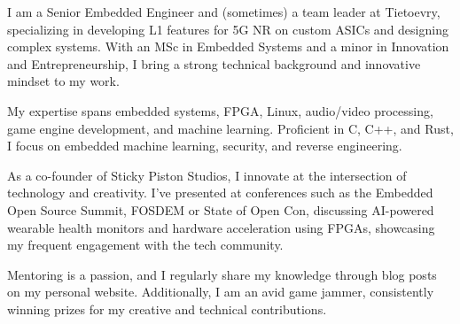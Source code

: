 \documentclass[11pt, a4paper]{awesome-cv}
\begin{document}
\makecvheader

\newline
I am a Senior Embedded Engineer and (sometimes) a team leader at Tietoevry, specializing in developing L1 features for 5G NR on custom ASICs and designing complex systems. With an MSc in Embedded Systems and a minor in Innovation and Entrepreneurship, I bring a strong technical background and innovative mindset to my work.

My expertise spans embedded systems, FPGA, Linux, audio/video processing, game engine development, and machine learning. Proficient in C, C++, and Rust, I focus on embedded machine learning, security, and reverse engineering.

As a co-founder of Sticky Piston Studios, I innovate at the intersection of technology and creativity. I've presented at conferences such as the Embedded Open Source Summit, FOSDEM or State of Open Con, discussing AI-powered wearable health monitors and hardware acceleration using FPGAs, showcasing my frequent engagement with the tech community.

Mentoring is a passion, and I regularly share my knowledge through blog posts on my personal website. Additionally, I am an avid game jammer, consistently winning prizes for my creative and technical contributions.




\vspace{20mm} %





\end{document}
